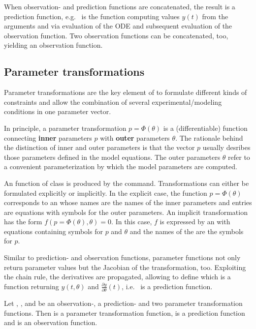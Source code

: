 \documentclass[article]{jss}
\begin{document}
When observation- and prediction functions are concatenated, the result is a prediction function, e.g.~ is the  function computing values $y(t)$ from the arguments  and  via evaluation of the ODE and subsequent evaluation of the observation function. Two observation functions can be concatenated, too, yielding an observation function.

\subsection{Parameter transformations}

Parameter transformations are the key element of  to formulate different kinds of constraints and allow the combination of several experimental/modeling conditions in one parameter vector.

In principle, a parameter transformation $p = \Phi(\theta)$ is a (differentiable) function connecting \textbf{inner} parameters $p$ with \textbf{outer} parameters $\theta$. The rationale behind the distinction of inner and outer parameters is that the vector $p$ usually desribes those parameters defined in the model equations. The outer parameters $\theta$ refer to a convenient parameterization by which the model parameters are computed.

An  function of class  is produced by the  command. Transformations can either be formulated explicitly or implicitly. In the explicit case, the function $p = \Phi(\theta)$ corresponds to an  whose names are the names of the inner parameters and entries are equations with symbols for the outer parameters. An implicit transformation has the form $f(p = \Phi(\theta), \theta) = 0$. In this case, $f$ is expressed by an  with equations containing symbols for $p$ and $\theta$ and the names of the  are the symbols for $p$.

Similar to prediction- and observation functions, parameter functions not only return parameter values but the Jacobian of the transformation, too. Exploiting the chain rule, the derivatives are propagated, allowing to define  which is a function returning $y(t, \theta)$ and $\frac{\partial y}{\partial \theta}(t)$, i.e.~ is a prediction function.

Let , ,  and  be an observation-, a prediction- and two parameter transformation functions. Then  is a parameter transformation function,  is a prediction function and  is an observation function.
 
\end{document}
